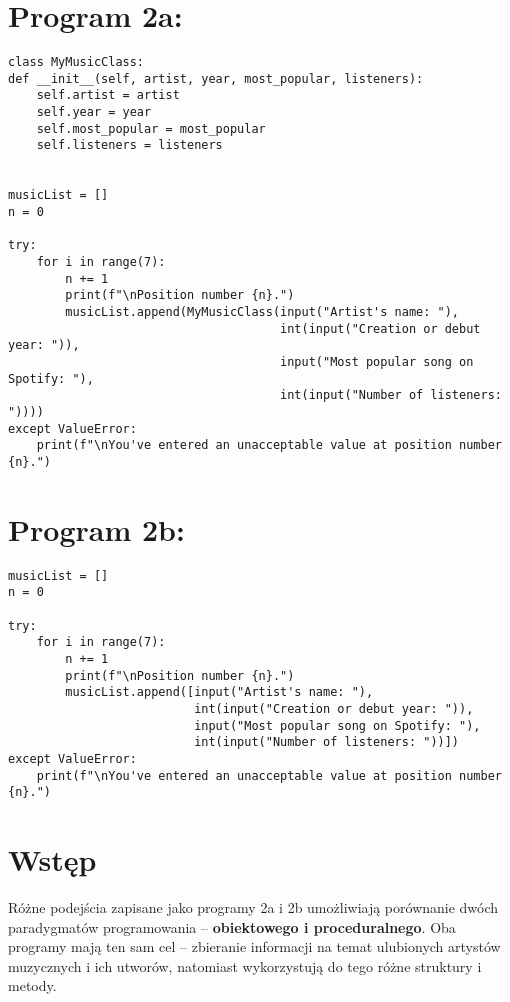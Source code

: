 \documentclass{article}
\author{Zuzanna Dybcio}
\date{December 2023}
\begin{document}
\section*{Program 2a:}
\begin{verbatim}
class MyMusicClass:
def __init__(self, artist, year, most_popular, listeners):
    self.artist = artist
    self.year = year
    self.most_popular = most_popular
    self.listeners = listeners


musicList = []
n = 0

try:
    for i in range(7):
        n += 1
        print(f"\nPosition number {n}.")
        musicList.append(MyMusicClass(input("Artist's name: "),
                                      int(input("Creation or debut year: ")),
                                      input("Most popular song on Spotify: "),
                                      int(input("Number of listeners: "))))
except ValueError:
    print(f"\nYou've entered an unacceptable value at position number {n}.")

\end{verbatim}

\section*{Program 2b:}
\begin{verbatim}
musicList = []
n = 0

try:
    for i in range(7):
        n += 1
        print(f"\nPosition number {n}.")
        musicList.append([input("Artist's name: "),
                          int(input("Creation or debut year: ")),
                          input("Most popular song on Spotify: "),
                          int(input("Number of listeners: "))])
except ValueError:
    print(f"\nYou've entered an unacceptable value at position number {n}.")

\end{verbatim}

\section{Wstęp}
Różne podejścia zapisane jako programy 2a i 2b umożliwiają porównanie dwóch paradygmatów programowania – \textbf{obiektowego i proceduralnego}. Oba programy mają ten sam cel – zbieranie informacji na temat ulubionych artystów muzycznych i ich utworów, natomiast wykorzystują do tego różne struktury i metody.
\end{document}
